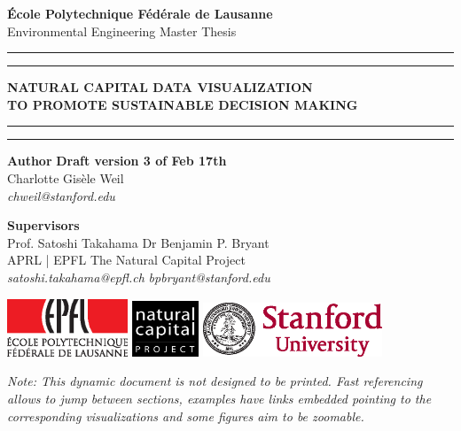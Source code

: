 
\begin{titlingpage}
\begin{center}
\Large
\textbf{École Polytechnique Fédérale de Lausanne} \\
\vspace{1cm}
Environmental Engineering Master Thesis
\vspace{2cm}
\hrule
\vspace{0.1cm}
\hrule
\vspace{1cm}
\Huge
\textbf{NATURAL CAPITAL DATA VISUALIZATION } \\
\huge
\textbf{TO PROMOTE SUSTAINABLE DECISION MAKING} \\

\Large
\vspace{0.2cm}

\vspace{1cm}
\hrule
\vspace{0.1cm}
\hrule

\end{center}
\vfill
\noindent \textbf{Author} \hfill \textbf{Draft version 3 of Feb 17th} \\
Charlotte Gisèle Weil \\
\textit{chweil@stanford.edu} \\
\vspace{0.5cm}

\noindent \textbf{Supervisors} \\
Prof. Satoshi Takahama          \hfill    Dr Benjamin P. Bryant \\
APRL | EPFL      \hfill    The Natural Capital Project\\
\textit{satoshi.takahama@epfl.ch} \hfill    \textit{bpbryant@stanford.edu} \\
\vspace{0.8cm}

\noindent \includegraphics[width=0.27\textwidth]{images/epfl-logo.eps}
\hfill  \hfill \hfill  \includegraphics[width=0.15\textwidth]{images/natcap-logo.eps} \hfill  \hfill 
\includegraphics[width=0.4\textwidth]{images/stanford-logo.eps}

\newpage
\vspace{\fill}
\textit{Note: This dynamic document is not designed to be printed. Fast referencing allows to jump between sections, examples have links embedded pointing to the corresponding visualizations and some figures aim to be zoomable.}

\end{titlingpage}

